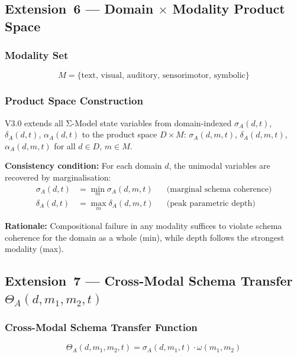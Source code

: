 \documentclass[11pt,a4paper]{article}
\begin{document}
\subsection{Extension~6 --- Domain \texorpdfstring{$\times$}{x} Modality Product Space}\label{sec:product-space}

\subsubsection{Modality Set}
\begin{equation}\label{eq:modalities}
M = \{\text{text, visual, auditory, sensorimotor, symbolic}\}
\end{equation}

\subsubsection{Product Space Construction}

V3.0 extends all Σ-Model state variables from domain-indexed
$\sigma_A(d, t)$, $\delta_A(d, t)$, $\alpha_A(d, t)$ to the product space $D \times M$:
$\sigma_A(d, m, t)$, $\delta_A(d, m, t)$, $\alpha_A(d, m, t)$ for all $d \in D$, $m \in M$.

\textbf{Consistency condition:} For each domain $d$, the unimodal variables
are recovered by marginalisation:
\begin{align}
\sigma_A(d, t) &= \min_m \sigma_A(d, m, t) & &\text{(marginal schema coherence)} \label{eq:marginal-sigma} \\
\delta_A(d, t) &= \max_m \delta_A(d, m, t) & &\text{(peak parametric depth)} \label{eq:marginal-delta}
\end{align}

\textbf{Rationale:} Compositional failure in any modality suffices to
violate schema coherence for the domain as a whole (min), while
depth follows the strongest modality (max).

\subsection{Extension~7 --- Cross-Modal Schema Transfer \texorpdfstring{$\Theta_A(d,m_1,m_2,t)$}{Theta\_A(d,m\_1,m\_2,t)}}\label{sec:cross-modal}

\subsubsection{Cross-Modal Schema Transfer Function}
\begin{equation}\label{eq:cross-modal-transfer}
\Theta_A(d, m_1, m_2, t) = \sigma_A(d, m_1, t) \cdot \omega(m_1, m_2)
\end{equation}
\end{document}
